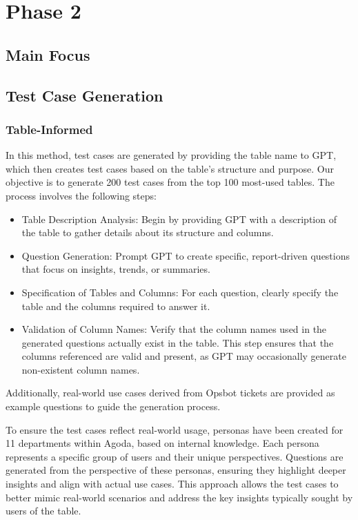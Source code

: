 \section{Phase 2}
    \subsection{Main Focus}
    \subsection{Test Case Generation}
        \subsubsection{Table-Informed}
        In this method, test cases are generated by providing the table name to GPT, which then creates test cases based on the table's structure and purpose. Our objective is to generate 200 test cases from the top 100 most-used tables. The process involves the following steps:
        \begin{itemize}
            \item Table Description Analysis: Begin by providing GPT with a description of the table to gather details about its structure and columns.
            \item Question Generation: Prompt GPT to create specific, report-driven questions that focus on insights, trends, or summaries.
            \item Specification of Tables and Columns: For each question, clearly specify the table and the columns required to answer it.
            \item Validation of Column Names: Verify that the column names used in the generated questions actually exist in the table. This step ensures that the columns referenced are valid and present, as GPT may occasionally generate non-existent column names.
        \end{itemize}
        Additionally, real-world use cases derived from Opsbot tickets are provided as example questions to guide the generation process.

        To ensure the test cases reflect real-world usage, personas have been created for 11 departments within Agoda, based on internal knowledge. Each persona represents a specific group of users and their unique perspectives. Questions are generated from the perspective of these personas, ensuring they highlight deeper insights and align with actual use cases. This approach allows the test cases to better mimic real-world scenarios and address the key insights typically sought by users of the table.
